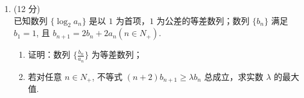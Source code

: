 \documentclass[17pt,twoside,space]{ctexart}
\begin{document}
\begin{enumerate}[itemsep=-0.3em,topsep=0pt,resume]
	\vspace{250pt}

\item (12 分)\\
已知数列 $\{\log_2a_n\}$ 是以 $1$ 为首项，$1$ 为公差的等差数列；数列 $\{b_n\}$ 满足 $b_1=1$, 且 $b_{n+1}=2b_n+2a_n (n\in N_+)$. 
    \begin{enumerate}[itemsep=-0.3em,label={(\arabic*)},topsep=0pt,labelsep=.5em,leftmargin=1.7em]
		\item 证明：数列 $\{\frac{b_n}{a_n}\}$ 为等差数列；
		\item 若对任意 $n\in N_+$, 不等式 $(n+2)b_{n+1}\geqslant \lambda b_n$ 总成立，求实数 $\lambda$ 的最大值.
	\end{enumerate}

\end{enumerate}



\clearpage
\end{document}
